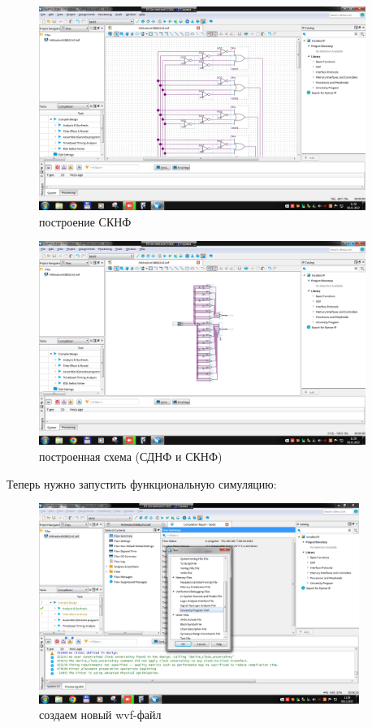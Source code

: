 \documentclass[a4paper]{article}
\begin{document}
  \begin{figure}[H]
    \centering
    \includegraphics[width=0.9475\textwidth]{02_16}
    \caption{построение СКНФ}
  \end{figure}
  
  \begin{figure}[H]
    \centering
    \includegraphics[width=0.9475\textwidth]{02_17}
    \caption{построенная схема (СДНФ и СКНФ)}
  \end{figure}
  
  Теперь нужно запустить функциональную симуляцию:

  \begin{figure}[H]
    \centering
    \includegraphics[width=0.93\textwidth]{02_31}
    \caption{создаем новый wvf-файл}
  \end{figure}
\end{document}
